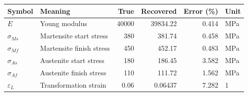 \begin{tabular}{llrrrl}
\toprule
Symbol & Meaning & True & Recovered & Error (\%) & Unit \\
\midrule
$E$ & Young modulus & 40000 & 39834.22 & 0.414 & MPa \\
$\sigma_{Ms}$ & Martensite start stress & 380 & 381.74 & 0.458 & MPa \\
$\sigma_{Mf}$ & Martensite finish stress & 450 & 452.17 & 0.483 & MPa \\
$\sigma_{As}$ & Austenite start stress & 180 & 186.45 & 3.582 & MPa \\
$\sigma_{Af}$ & Austenite finish stress & 110 & 111.72 & 1.562 & MPa \\
$\varepsilon_L$ & Transformation strain & 0.06 & 0.06437 & 7.282 & 1 \\
\bottomrule
\end{tabular}
